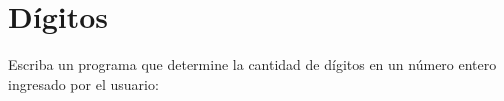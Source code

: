 \section{Dígitos}

Escriba un programa que determine la cantidad de dígitos en un número
entero ingresado por el usuario:
